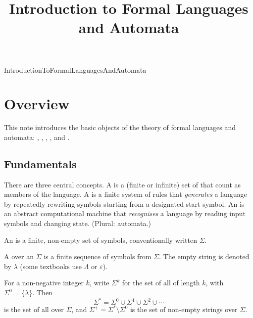 \documentclass[hidelinks]{article}
\title{Introduction to Formal Languages and Automata}
\author{}
\date{}
\begin{document}
\maketitle

\begin{smodule}[title={Introduction to Formal Languages and Automata}]{IntroductionToFormalLanguagesAndAutomata}


\section{Overview}

This note introduces the basic objects of the theory of formal languages and automata: , , , , and .

\subsection{Fundamentals}

There are three central concepts.
A  is a (finite or infinite) set of  that count as members of the language.
A  is a finite system of rules that \emph{generates} a language by repeatedly rewriting symbols starting from a designated start symbol.
An  is an abstract computational machine that \emph{recognises} a language by reading input symbols and changing state. (Plural: automata.)

\begin{sdefinition}[for=alphabet]
    An  is a finite, non-empty set of symbols, conventionally written $\Sigma$.
\end{sdefinition}

\begin{sdefinition}[for=string]
    A  over an  $\Sigma$ is a finite sequence of symbols from $\Sigma$. The empty string is denoted by $\lambda$ (some textbooks use $\Lambda$ or $\varepsilon$).
\end{sdefinition}

For a non-negative integer $k$, write $\Sigma^k$ for the set of all  of length $k$, with $\Sigma^0 = \{\lambda\}$. Then
\[
\Sigma^* = \Sigma^0 \cup \Sigma^1 \cup \Sigma^2 \cup \cdots
\]
is the set of all  over $\Sigma$, and $\Sigma^+ = \Sigma^* \setminus \Sigma^0$ is the set of non-empty strings over $\Sigma$.


\end{smodule}
\end{document}
